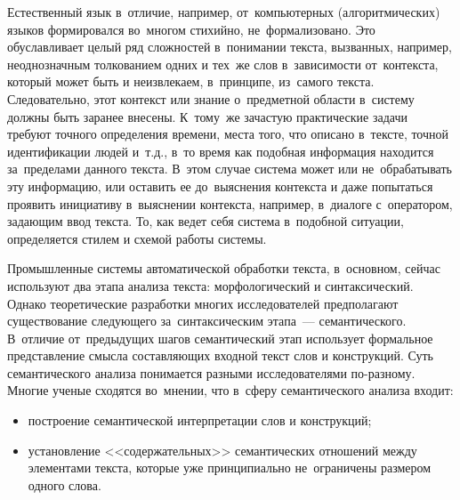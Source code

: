 \documentclass[12pt]{article}
\theoremstyle{definition}
\theoremstyle{remark}
\numberwithin{equation}{section}
\begin{document}
Естественный язык в~отличие, например, от~компьютерных (алгоритмических)
языков формировался во~многом стихийно, не~формализовано. Это
обуславливает целый ряд сложностей в~понимании текста, вызванных,
например, неоднозначным толкованием одних и тех~же слов в~зависимости
от~контекста, который может быть и неизвлекаем, в~принципе, из~самого
текста. Следовательно, этот контекст или знание о~предметной области
в~систему должны быть заранее внесены. К~тому~же зачастую практические
задачи требуют точного определения времени, места того, что описано
в~тексте, точной идентификации людей и~т.д., в~то время как подобная
информация находится за~пределами данного текста. В~этом случае система
может или не~обрабатывать эту информацию, или оставить ее до~выяснения
контекста и даже попытаться проявить инициативу в~выяснении контекста,
например, в~диалоге с~оператором, задающим ввод текста. То, как ведет
себя система в~подобной ситуации, определяется стилем и схемой работы
системы.

Промышленные системы автоматической обработки текста, в~основном, сейчас
используют два этапа анализа текста: морфологический и синтаксический.
Однако теоретические разработки многих исследователей предполагают
существование следующего за~синтаксическим этапа~--- семантического.
В~отличие от~предыдущих шагов семантический этап использует формальное
представление смысла составляющих входной текст слов и конструкций.
Суть семантического анализа понимается разными исследователями по-разному.
Многие ученые сходятся во~мнении, что в~сферу семантического анализа входит:
\begin{itemize}
    \item построение семантической интерпретации слов и конструкций;
    \item установление <<содержательных>> семантических отношений
    между элементами текста, которые уже принципиально не~ограничены
    размером одного слова.
\end{itemize}
\end{document}
